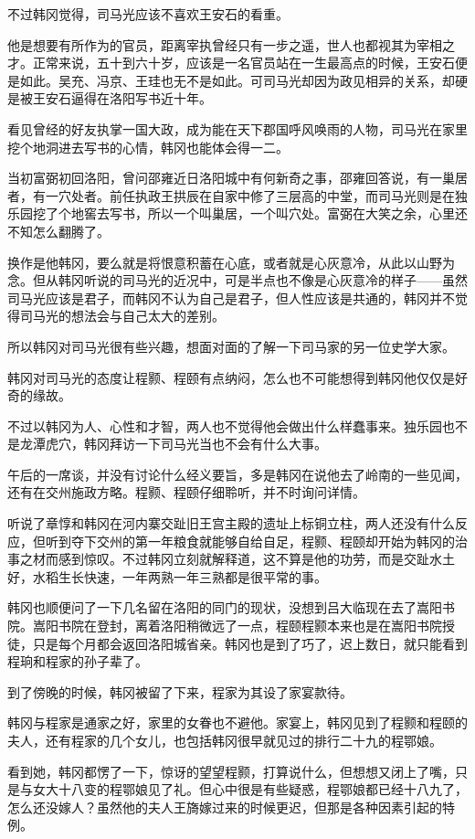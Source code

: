 不过韩冈觉得，司马光应该不喜欢王安石的看重。

他是想要有所作为的官员，距离宰执曾经只有一步之遥，世人也都视其为宰相之才。正常来说，五十到六十岁，应该是一名官员站在一生最高点的时候，王安石便是如此。吴充、冯京、王珪也无不是如此。可司马光却因为政见相异的关系，却硬是被王安石逼得在洛阳写书近十年。

看见曾经的好友执掌一国大政，成为能在天下郡国呼风唤雨的人物，司马光在家里挖个地洞进去写书的心情，韩冈也能体会得一二。

当初富弼初回洛阳，曾问邵雍近日洛阳城中有何新奇之事，邵雍回答说，有一巢居者，有一穴处者。前任执政王拱辰在自家中修了三层高的中堂，而司马光则是在独乐园挖了个地窖去写书，所以一个叫巢居，一个叫穴处。富弼在大笑之余，心里还不知怎么翻腾了。

换作是他韩冈，要么就是将恨意积蓄在心底，或者就是心灰意冷，从此以山野为念。但从韩冈听说的司马光的近况中，可是半点也不像是心灰意冷的样子——虽然司马光应该是君子，而韩冈不认为自己是君子，但人性应该是共通的，韩冈并不觉得司马光的想法会与自己太大的差别。

所以韩冈对司马光很有些兴趣，想面对面的了解一下司马家的另一位史学大家。

韩冈对司马光的态度让程颢、程颐有点纳闷，怎么也不可能想得到韩冈他仅仅是好奇的缘故。

不过以韩冈为人、心性和才智，两人也不觉得他会做出什么样蠢事来。独乐园也不是龙潭虎穴，韩冈拜访一下司马光当也不会有什么大事。

午后的一席谈，并没有讨论什么经义要旨，多是韩冈在说他去了岭南的一些见闻，还有在交州施政方略。程颢、程颐仔细聆听，并不时询问详情。

听说了章惇和韩冈在河内寨交趾旧王宫主殿的遗址上标铜立柱，两人还没有什么反应，但听到夺下交州的第一年粮食就能够自给自足，程颢、程颐却开始为韩冈的治事之材而感到惊叹。不过韩冈立刻就解释道，这不算是他的功劳，而是交趾水土好，水稻生长快速，一年两熟一年三熟都是很平常的事。

韩冈也顺便问了一下几名留在洛阳的同门的现状，没想到吕大临现在去了嵩阳书院。嵩阳书院在登封，离着洛阳稍微远了一点，程颐程颢本来也是在嵩阳书院授徒，只是每个月都会返回洛阳城省亲。韩冈也是到了巧了，迟上数日，就只能看到程珦和程家的孙子辈了。

到了傍晚的时候，韩冈被留了下来，程家为其设了家宴款待。

韩冈与程家是通家之好，家里的女眷也不避他。家宴上，韩冈见到了程颢和程颐的夫人，还有程家的几个女儿，也包括韩冈很早就见过的排行二十九的程鄂娘。

看到她，韩冈都愣了一下，惊讶的望望程颢，打算说什么，但想想又闭上了嘴，只是与女大十八变的程鄂娘见了礼。但心中很是有些疑惑，程鄂娘都已经十八九了，怎么还没嫁人？虽然他的夫人王旖嫁过来的时候更迟，但那是各种因素引起的特例。

